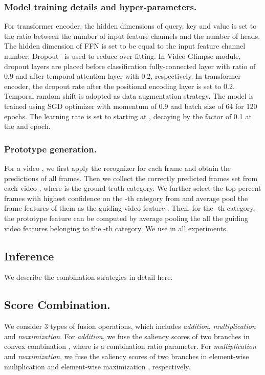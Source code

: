 \documentclass[runningheads]{llncs}
\begin{document}
\subsubsection{Model training details and hyper-parameters.}
For transformer encoder, the hidden dimensions of query, key and value is set to the ratio between the number of input feature channels and the number of heads. The hidden dimension of FFN is set to be equal to the input feature channel number. Dropout~\cite{dropout} is used to reduce over-fitting. In Video Glimpse module, dropout layers are placed before classification fully-connected layer with ratio of 0.9 and after temporal attention layer with 0.2, respectively. In transformer encoder, the dropout rate after the positional encoding layer is set to 0.2. Temporal random shift is adopted as data augmentation strategy. The model is trained using SGD optimizer with momentum of 0.9 and batch size of 64 for 120 epochs. The learning rate is set to starting at , decaying by the factor of 0.1 at the  and  epoch. 

\subsubsection{Prototype generation.}
For a video , we first apply the recognizer for each frame and obtain the predictions  of all frames. Then we collect the correctly predicted frames set from each video , where  is the ground truth category. We further select the top  percent frames with highest confidence on the -th category  from  and average pool the frame features of them as the guiding video feature . Then, for the -th category, the prototype feature  can be computed by average pooling the all the guiding video features belonging to the -th category. We use   in all experiments. 


\subsection{Inference} \label{appendix:test_details}
We describe the combination strategies in detail here.

\subsection{Score Combination.}
We consider 3 types of fusion operations, which includes \textit{addition}, \textit{multiplication} and \textit{maximization}. For \textit{addition}, we fuse the saliency scores of two branches in convex combination , where  is a combination ratio parameter. For \textit{multiplication} and \textit{maximization}, we fuse the saliency scores of two branches in element-wise muliplication  and element-wise maximization , respectively. 
\end{document}
